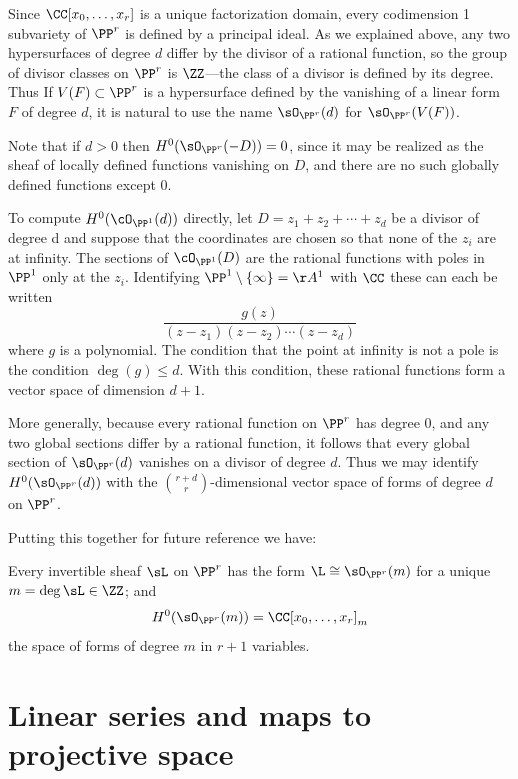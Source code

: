 \begin{example} \label{linear series on Pr} Since $\CC[x_0,\dots,x_r]$ is a 
unique factorization domain, every codimension 1 subvariety of $\PP^r$ is defined by a principal ideal. As we explained above,
any two hypersurfaces of degree $d$ differ by the divisor of a rational function, so
the group of divisor classes on $\PP^r$ is $\ZZ$---the class of a divisor is defined by its degree.
Thus If $V(F)\subset \PP^{r}$ is a hypersurface defined by the vanishing of a linear form 
$F$ of degree $d$,
it is natural to use the name $\sO_{\PP^r}(d)$  for $\sO_{\PP^r}(V(F))$.

Note that if $d>0$ then $H^{0}(\sO_{\PP^{r}}(-D)) = 0$, since it may be realized
as the sheaf of locally defined functions vanishing on $D$, and there are no such
globally defined functions except 0.
 
To compute $H^0(\cO_{\PP^1} (d))$ directly, let $D = z_1 +z_2 +\cdots+z_d$ be a divisor of degree d and suppose that the coordinates are chosen so that none of the $z_i$ are at infinity. The sections of $\cO_{\PP^1} (D)$ are the rational functions with poles in $\PP^1$ only at 
the $z_i$. Identifying $\PP^1\setminus \{\infty\} = \AA^1$ with $\CC$ these can each be written
$$
\frac{g(z)}{(z-z_1)(z-z_2)\cdots(z-z_d)}
$$
where $g$ is a polynomial. The condition that the point at infinity is not a pole is the condition $\deg(g) \leq d$. With this condition, these rational functions form a vector space of dimension $d+1$.

More generally, because every
rational function on $\PP^{r}$ has degree 0, and any two global sections differ by a rational
function, it follows that every global section of $\sO_{\PP^{r}}(d)$ vanishes on a divisor of degree $d$. Thus
we may identify $H^{0}(\sO_{\PP^{r}}(d))$ with the ${r+d\choose r}$-dimensional vector space of forms of degree $d$ on $\PP^{r}$.

Putting this together for future reference we have:
\begin{proposition}
 Every invertible sheaf $\sL$ on $\PP^r$ has the form $\L \cong \sO_{\PP^r}(m)$ for a unique $m = \deg \sL \in \ZZ$; and
 $$
 H^0(\sO_{\PP^r}(m)) = \CC[x_0,\dots, x_r]_m
 $$
 the space of forms of degree $m$ in $r+1$ variables.
\end{proposition}
\end{example}


\section{Linear series and maps to projective space}

